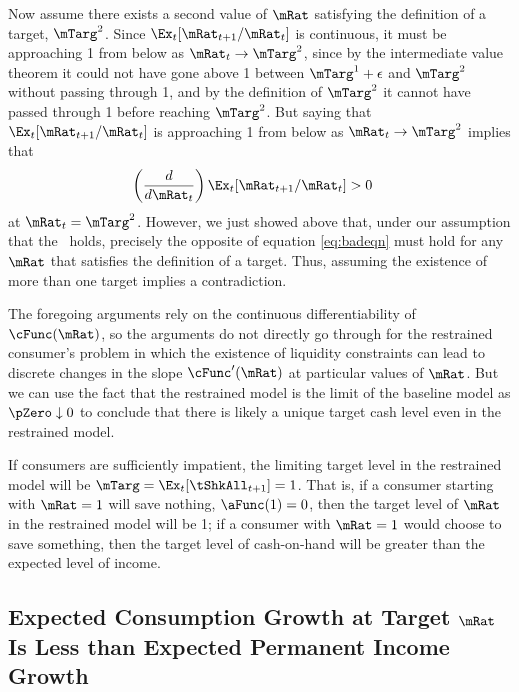 \documentclass[./BufferStockTheory.tex]{subfiles}
\begin{document}
Now assume there exists a second value of $\mRat$ satisfying the
definition of a target, $\mTarg^{2}$. Since
$\Ex_{t}[{\mRat}_{t+1}/\mRat_{t}]$ is continuous, it must be
approaching 1 from below as $\mRat_{t} \rightarrow \mTarg^{2}$, since
by the intermediate value theorem it could not have gone above 1
between $\mTarg^{1}+\epsilon$ and $\mTarg^{2}$ without passing through
1, and by the definition of $\mTarg^{2}$ it cannot have passed through
1 before reaching $\mTarg^{2}$.  But saying that
$\Ex_{t}[{\mRat}_{t+1}/\mRat_{t}]$ is approaching 1 from below as
$\mRat_{t} \rightarrow \mTarg^{2}$ implies that
\begin{equation}\begin{gathered}\begin{aligned}
\left(\frac{d}{d\mRat_{t}}\right)\Ex_{t}[{\mRat}_{t+1}/\mRat_{t}]  & > 0
\label{eq:badeqn}
\end{aligned}\end{gathered}\end{equation}
at $\mRat_{t}=\mTarg^{2}$. However, we just showed above that, under
our assumption that the \GIC~holds, precisely the opposite of equation
\eqref{eq:badeqn} must hold for any $\mRat$ that satisfies the definition
of a target. Thus, assuming the existence of more than one target
implies a contradiction.

The foregoing arguments rely on the continuous differentiability of
$\cFunc(\mRat)$, so the arguments do not directly go through for the
restrained consumer's problem in which the existence of liquidity
constraints can lead to discrete changes in the slope
$\cFunc^{\prime}(\mRat)$ at particular values of $\mRat$. But we can
use the fact that the restrained model is the limit of the baseline
model as $\pZero \downarrow 0$ to conclude that there is likely a
unique target cash level even in the restrained model.

If consumers are sufficiently impatient, the limiting target level in the
restrained model will be $\mTarg = \Ex_{t}[{\tShkAll}_{t+1}] = 1$. That
is, if a consumer starting with $\mRat = 1$ will save nothing, ${\aFunc}(1)=0$,
then the target level of $\mRat$ in the restrained model will be 1; if a
consumer with $\mRat=1$ would choose to save something, then the target
level of cash-on-hand will be greater than the expected level of income.

\hypertarget{cGroLTpGro}{}
\subsection{Expected Consumption Growth at Target $\mRat$ Is Less than
Expected Permanent Income Growth}
\end{document}
